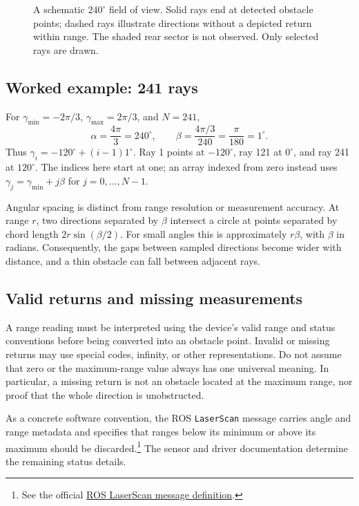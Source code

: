 \begin{figure}[htbp]
\centering
\caption{A schematic $240^\circ$ field of view. Solid rays end at detected
obstacle points; dashed rays illustrate directions without a depicted return
within range. The shaded rear sector is not observed. Only selected rays
are drawn.}
\label{fig:l06-scan}
\end{figure}

\subsection{Worked example: 241 rays}
For $\gamma_{\min}=-2\pi/3$, $\gamma_{\max}=2\pi/3$, and $N=241$,
\[
 \alpha=\frac{4\pi}{3}=240^\circ,\qquad
 \beta=\frac{4\pi/3}{240}=\frac{\pi}{180}=1^\circ.
\]
Thus $\gamma_i=-120^\circ+(i-1)1^\circ$. Ray 1 points at
$-120^\circ$, ray 121 at $0^\circ$, and ray 241 at $120^\circ$.
The indices here start at one; an array indexed from zero instead uses
$\gamma_j=\gamma_{\min}+j\beta$ for $j=0,\ldots,N-1$.

Angular spacing is distinct from range resolution or measurement accuracy.
At range $r$, two directions separated by $\beta$ intersect a circle at points
separated by chord length $2r\sin(\beta/2)$. For small angles this is
approximately $r\beta$, with $\beta$ in radians. Consequently, the gaps between
sampled directions become wider with distance, and a thin obstacle can fall
between adjacent rays.

\subsection{Valid returns and missing measurements}
A range reading must be interpreted using the device's valid range and
status conventions before being converted into an obstacle point. Invalid
or missing returns may use special codes, infinity, or other representations.
Do not assume that zero or the maximum-range value always has one universal
meaning. In particular, a missing return is not an obstacle located at the
maximum range, nor proof that the whole direction is unobstructed.

As a concrete software convention, the ROS \texttt{LaserScan} message carries
angle and range metadata and specifies that ranges below its minimum or above
its maximum should be discarded.\footnote{See the official
\href{https://github.com/ros2/common_interfaces/blob/rolling/sensor_msgs/msg/LaserScan.msg}{ROS LaserScan message definition}.}
The sensor and driver documentation determine the remaining status details.

